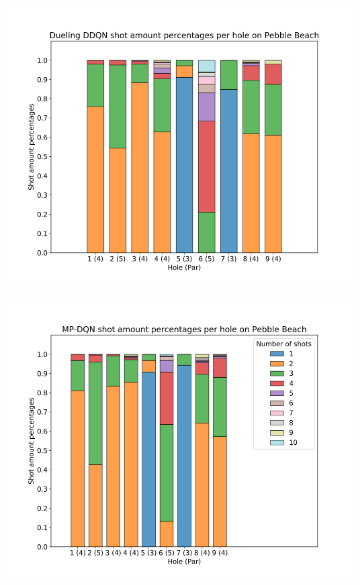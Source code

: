 \documentclass{kththesis}
\begin{document}
\begin{figure}
{\begin{subfigure}{0.3\paperwidth}
    \centering
    \includegraphics[width=0.3\paperwidth]{AgentPercentages/DDDQN_Shot_Percentages_Pebble.png} 
    \end{subfigure}
    \begin{subfigure}{0.3\paperwidth}
    \centering
    \includegraphics[width=0.3\paperwidth]{AgentPercentages/MPDQN_Shot_Percentages_Pebble.png} 
    \end{subfigure}
    }
    \makebox[\linewidth][c]{
    \begin{subfigure}{0.3\paperwidth}
    \centering

\end{subfigure}}
\end{figure}
\end{document}
